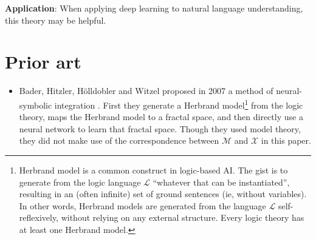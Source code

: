 \documentclass[orivec]{llncs}
\begin{document}

\textbf{Application}:  When applying deep learning to natural language understanding, this theory may be helpful.


\section{Prior art}

\begin{itemize}
\renewcommand\labelitemi{\textbullet}


\item Bader, Hitzler, H\"{o}lldobler and Witzel proposed in 2007 a method of neural-symbolic integration \cite{Bader2007}.  First they generate a Herbrand model\footnote{Herbrand model is a common construct in logic-based AI.  The gist is to generate from the logic language $\mathcal{L}$ ``whatever that can be instantiated'', resulting in an (often infinite) set of ground sentences (ie, without variables).  In other words, Herbrand models are generated from the language $\mathcal{L}$ self-reflexively, without relying on any external structure.  Every logic theory has at least one Herbrand model.} from the logic theory, maps the Herbrand model to a fractal space, and then directly use a neural network to learn that fractal space.  Though they used model theory, they did not make use of the correspondence between $\mathcal{M}$ and $\mathcal{X}$ in this paper.



\end{itemize}
\end{document}
